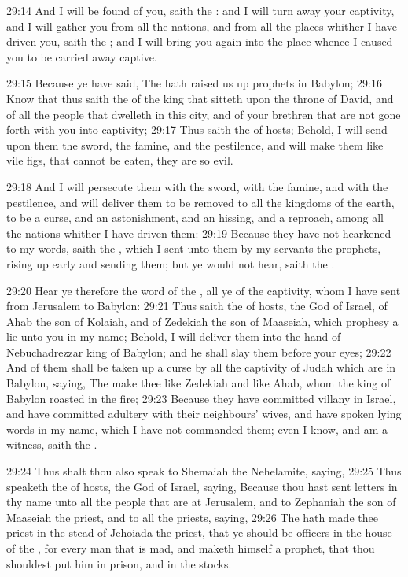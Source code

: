 29:14 And I will be found of you, saith the \LORD: and I will turn away
your captivity, and I will gather you from all the nations, and from
all the places whither I have driven you, saith the \LORD; and I will
bring you again into the place whence I caused you to be carried away
captive.

29:15 Because ye have said, The \LORD hath raised us up prophets in
Babylon; 29:16 Know that thus saith the \LORD of the king that sitteth
upon the throne of David, and of all the people that dwelleth in this
city, and of your brethren that are not gone forth with you into
captivity; 29:17 Thus saith the \LORD of hosts; Behold, I will send
upon them the sword, the famine, and the pestilence, and will make
them like vile figs, that cannot be eaten, they are so evil.

29:18 And I will persecute them with the sword, with the famine, and
with the pestilence, and will deliver them to be removed to all the
kingdoms of the earth, to be a curse, and an astonishment, and an
hissing, and a reproach, among all the nations whither I have driven
them: 29:19 Because they have not hearkened to my words, saith the
\LORD, which I sent unto them by my servants the prophets, rising up
early and sending them; but ye would not hear, saith the \LORD.

29:20 Hear ye therefore the word of the \LORD, all ye of the captivity,
whom I have sent from Jerusalem to Babylon: 29:21 Thus saith the \LORD
of hosts, the God of Israel, of Ahab the son of Kolaiah, and of
Zedekiah the son of Maaseiah, which prophesy a lie unto you in my
name; Behold, I will deliver them into the hand of Nebuchadrezzar king
of Babylon; and he shall slay them before your eyes; 29:22 And of them
shall be taken up a curse by all the captivity of Judah which are in
Babylon, saying, The \LORD make thee like Zedekiah and like Ahab, whom
the king of Babylon roasted in the fire; 29:23 Because they have
committed villany in Israel, and have committed adultery with their
neighbours' wives, and have spoken lying words in my name, which I
have not commanded them; even I know, and am a witness, saith the
\LORD.

29:24 Thus shalt thou also speak to Shemaiah the Nehelamite, saying,
29:25 Thus speaketh the \LORD of hosts, the God of Israel, saying,
Because thou hast sent letters in thy name unto all the people that
are at Jerusalem, and to Zephaniah the son of Maaseiah the priest, and
to all the priests, saying, 29:26 The \LORD hath made thee priest in
the stead of Jehoiada the priest, that ye should be officers in the
house of the \LORD, for every man that is mad, and maketh himself a
prophet, that thou shouldest put him in prison, and in the stocks.

